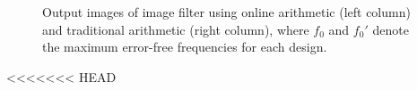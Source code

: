 \documentclass{acm_proc_article-sp}
\begin{document}
\begin{figure}[htb]
{\begin{minipage}[c]{0.24\textwidth}
  \end{minipage}
  }\vspace{-1ex}
\vspace{-2ex}
\caption{Output images of image filter using online arithmetic (left column) and traditional arithmetic (right column), where $f_0$ and ${f_0}'$ denote the maximum error-free frequencies for each design.}
\label{Fig:LenaImage}
\vspace{-1ex}
\end{figure}

<<<<<<< HEAD
\vspace{-1ex}
\end{document}
